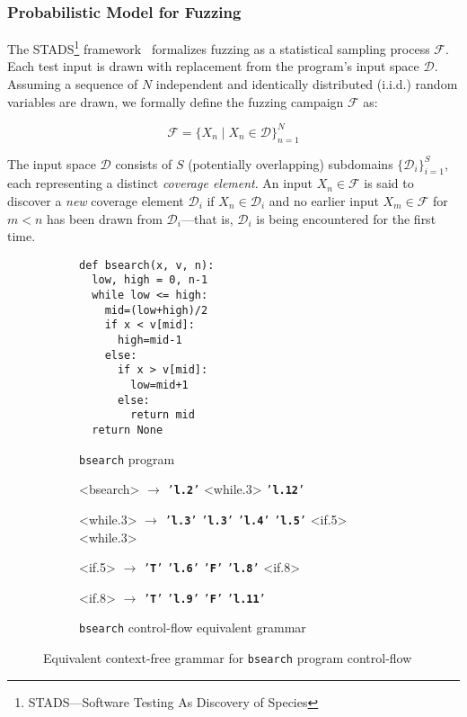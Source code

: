 \documentclass[conference,anonymous,review]{IEEEtran}
\def\<#1>{\texttt{#1}}
\def\term#1{\texttt{'\textbf{#1}'}}
\begin{document}
\subsubsection{Probabilistic Model for Fuzzing}
The STADS\footnote{STADS—Software Testing As Discovery of Species} framework~\cite{boehme2018stads,boehme2021residual,nguyen2022bedivfuzz,boehme2020boosting} formalizes
fuzzing as a statistical sampling process $\mathcal{F}$. Each test input is drawn with replacement from the program's input space $\pmb{\mathcal{D}}$. Assuming a sequence of $N$ independent and identically distributed (i.i.d.) random variables are drawn, we formally define the fuzzing campaign $\mathcal{F}$ as:

\begin{equation*}
    \mathcal{F}=\{X_n \mid X_n \in \pmb{\mathcal{D}}\}_{n=1}^N
\end{equation*}

The input space $\pmb{\mathcal{D}}$ consists of $S$ (potentially overlapping) subdomains $\{\mathcal{D}_i\}_{i=1}^S$, each representing a distinct \emph{coverage element}. An input $X_n \in \mathcal{F}$ is said to discover a \emph{new} coverage element $\mathcal{D}_i$ if $X_n \in \mathcal{D}_i$ and no earlier input $X_m \in \mathcal{F}$ for $m < n$ has been drawn from $\mathcal{D}_i$—that is, $\mathcal{D}_i$ is being encountered for the first time.

\begin{figure*}[ht] %
  \centering
\begin{subfigure}[h]{0.45\textwidth} %
  \centering
{} %
\begin{lstlisting}[style=Python, escapechar=|,numbersep=2pt]
def bsearch(x, v, n):
  low, high = 0, n-1
  while low <= high:
    mid=(low+high)/2
    if x < v[mid]:
      high=mid-1
    else:
      if x > v[mid]:
        low=mid+1
      else:
        return mid
  return None
\end{lstlisting}
\caption{\<bsearch> program}
\label{fig:bsearch1}
\end{subfigure}
\begin{subfigure}[h]{0.45\textwidth}   %
  \centering
\begin{grammar}%
  <bsearch> $\rightarrow$ \term{l.2} <while.3> \term{l.12}

  <while.3> $\rightarrow$ \term{l.3}
   \alt \term{l.3} \term{l.4} \term{l.5} <if.5> <while.3>

  <if.5>  $\rightarrow$  \term{T} \term{l.6}
   \alt \term{F} \term{l.8} <if.8>

  <if.8> $\rightarrow$ \term{T} \term{l.9}
   \alt \term{F} \term{l.11}
\end{grammar}
\caption{\<bsearch> control-flow equivalent grammar}
\label{fig:bsearch3}
\end{subfigure}
\caption{Equivalent context-free grammar for \<bsearch> program control-flow}
\label{fig:bsearch}
\end{figure*}
\end{document}
